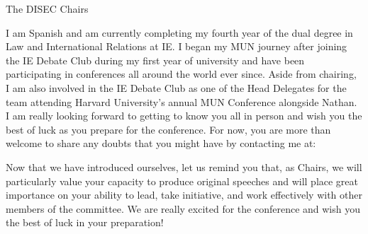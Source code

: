\begin{chairletter}{The DISEC Chairs}

I am Spanish and am currently completing my fourth year of the dual degree in Law and International Relations at IE. I began my MUN journey after joining the IE Debate Club during my first year of university and have been participating in conferences all around the world ever since. Aside from chairing, I am also involved in the IE Debate Club as one of the Head Delegates for the team attending Harvard University’s annual MUN Conference alongside Nathan. I am really looking forward to getting to know you all in person and wish you the best of luck as you prepare for the conference. For now, you are more than welcome to share any doubts that you might have by contacting me at: 

Now that we have introduced ourselves, let us remind you that, as Chairs, we will particularly value your capacity to produce original speeches and will place great importance on your ability to lead, take initiative, and work effectively with other members of the committee. We are really excited for the conference and wish you the best of luck in your preparation!

\end{chairletter}
